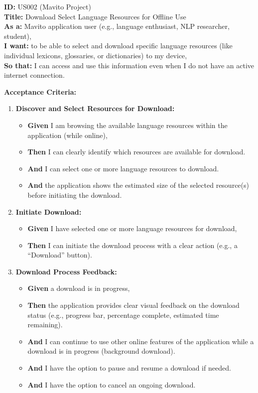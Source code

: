 \documentclass[12pt]{article}
\begin{document}
\textbf{ID:} US002 (Mavito Project) \\
\textbf{Title:} Download Select Language Resources for Offline Use \\
\textbf{As a:} Mavito application user (e.g., language enthusiast, NLP researcher, student), \\
\textbf{I want:} to be able to select and download specific language resources (like individual lexicons, glossaries, or dictionaries) to my device, \\
\textbf{So that:} I can access and use this information even when I do not have an active internet connection.

\vspace{1em}
\textbf{Acceptance Criteria:}
\begin{enumerate}
    \item \textbf{Discover and Select Resources for Download:}
    \begin{itemize}
        \item \textbf{Given} I am browsing the available language resources within the application (while online),
        \item \textbf{Then} I can clearly identify which resources are available for download.
        \item \textbf{And} I can select one or more language resources to download.
        \item \textbf{And} the application shows the estimated size of the selected resource(s) before initiating the download.
    \end{itemize}

    \item \textbf{Initiate Download:}
    \begin{itemize}
        \item \textbf{Given} I have selected one or more language resources for download,
        \item \textbf{Then} I can initiate the download process with a clear action (e.g., a ``Download'' button).
    \end{itemize}

    \item \textbf{Download Process Feedback:}
    \begin{itemize}
        \item \textbf{Given} a download is in progress,
        \item \textbf{Then} the application provides clear visual feedback on the download status (e.g., progress bar, percentage complete, estimated time remaining).
        \item \textbf{And} I can continue to use other online features of the application while a download is in progress (background download).
        \item \textbf{And} I have the option to pause and resume a download if needed.
        \item \textbf{And} I have the option to cancel an ongoing download.
    \end{itemize}


\end{enumerate}
\end{document}
